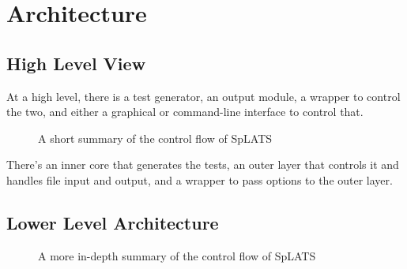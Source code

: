 \chapter{Architecture}

\section{High Level View}

  At a high level, there is a test generator, an output module, a wrapper to control the two, and either a graphical or command-line interface to control that.
\begin{center}
\begin{figure}
\caption{A short summary of the control flow of SpLATS}
\end{figure}
\end{center}

    There's an inner core that generates the tests, an outer layer that controls it and handles file input and output, and a wrapper to pass options to the outer layer.
    
\section{Lower Level Architecture}

  \begin{center}
  \begin{figure}
  
  \caption{A more in-depth summary of the control flow of SpLATS}
  \end{figure}
  \end{center}
  
